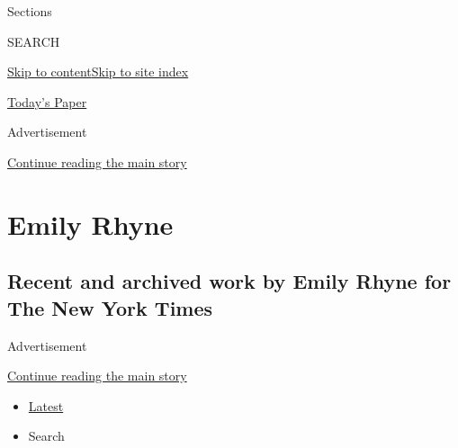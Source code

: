 Sections

SEARCH

\protect\hyperlink{site-content}{Skip to
content}\protect\hyperlink{site-index}{Skip to site index}

\href{https://myaccount.nytimes3xbfgragh.onion/auth/login?response_type=cookie\&client_id=vi}{}

\href{https://www.nytimes3xbfgragh.onion/section/todayspaper}{Today's
Paper}

Advertisement

\protect\hyperlink{after-top}{Continue reading the main story}

\hypertarget{emily-rhyne}{%
\section{Emily Rhyne}\label{emily-rhyne}}

\hypertarget{recent-and-archived-work-by-emily-rhyne-for-the-new-york-times}{%
\subsection{Recent and archived work by Emily Rhyne for The New York
Times}\label{recent-and-archived-work-by-emily-rhyne-for-the-new-york-times}}

Advertisement

\protect\hyperlink{after-mid1}{Continue reading the main story}

\begin{itemize}
\tightlist
\item
  \protect\hyperlink{stream-panel}{Latest}
\item
  Search
\end{itemize}

